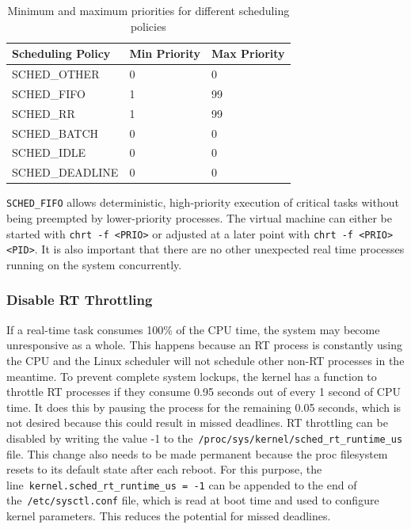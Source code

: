 \documentclass[MMR,Master,english]{twbook}
\begin{document}
\vspace{2em}
\begin{table}[H]
	\centering
	\caption{Minimum and maximum priorities for different scheduling policies}
	\label{tab:scheduling_priorities}
	\setlength{\tabcolsep}{0.5em} %
	{\renewcommand{\arraystretch}{1.2}%
		\begin{tabular}{|l|l|l|}
			\hline
			\textbf{Scheduling Policy} & \textbf{Min Priority} & \textbf{Max Priority} \\ \hline
			SCHED\_OTHER               & 0                     & 0                     \\ \hline
			SCHED\_FIFO                & 1                     & 99                    \\ \hline
			SCHED\_RR                  & 1                     & 99                    \\ \hline
			SCHED\_BATCH               & 0                     & 0                     \\ \hline
			SCHED\_IDLE                & 0                     & 0                     \\ \hline
			SCHED\_DEADLINE            & 0                     & 0                     \\ \hline
		\end{tabular}}
\end{table}

\noindent \texttt{SCHED\_FIFO} allows deterministic, high-priority execution of critical tasks without being preempted by lower-priority processes. The virtual machine can either be started with \texttt{chrt -f <PRIO>} or adjusted at a later point with \texttt{chrt -f <PRIO> <PID>}. It is also important that there are no other unexpected real time processes running on the system concurrently.
\subsubsection{Disable RT Throttling}
If a real-time task consumes 100\% of the CPU time, the system may become unresponsive as a whole. This happens because an RT process is constantly using the CPU and the Linux scheduler will not schedule other non-RT processes in the meantime. To prevent complete system lockups, the kernel has a function to throttle RT processes if they consume 0.95 seconds out of every 1 second of CPU time. It does this by pausing the process for the remaining 0.05 seconds, which is not desired because this could result in missed deadlines. RT throttling can be disabled by  writing the value -1 to the~\texttt{/proc/sys/kernel/sched\_rt\_runtime\_us} file. This change also needs to be made permanent because the proc filesystem resets to its default state after each reboot. For this purpose, the line~\texttt{kernel.sched\_rt\_runtime\_us = -1} can be appended to the end of the~\texttt{/etc/sysctl.conf} file, which is read at boot time and used to configure kernel parameters. This reduces the potential for missed deadlines.
\clearpage
\end{document}
